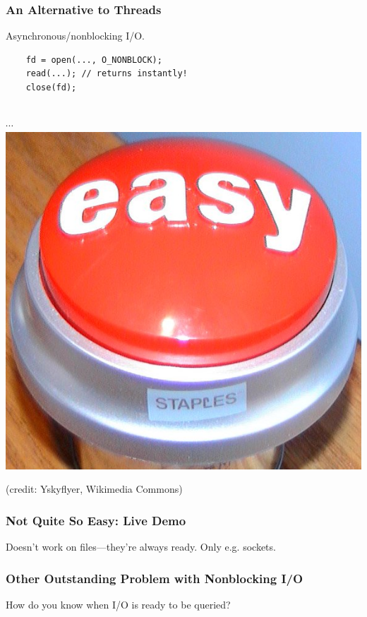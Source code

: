 \documentclass[aspectratio=43]{beamer}
\newenvironment{changemargin}[1]{%
  \begin{list}{}{%
    \setlength{\topsep}{0pt}%
    \setlength{\leftmargin}{#1}%
    \setlength{\rightmargin}{1em}
    \setlength{\listparindent}{\parindent}%
    \setlength{\itemindent}{\parindent}%
    \setlength{\parsep}{\parskip}%
  }%
  \item[]}{\end{list}}
\begin{document}
\begin{frame}[fragile]
  \frametitle{An Alternative to Threads}
  \begin{changemargin}{2em}
    Asynchronous/nonblocking I/O.\\[2em]

\begin{changemargin}{3em}
\begin{minipage}{.6\textwidth}
\begin{lstlisting}
    fd = open(..., O_NONBLOCK);
    read(...); // returns instantly!
    close(fd);
  \end{lstlisting}
\end{minipage}
\end{changemargin}

\begin{center}
~\\[1em]
$\cdots$\\[2em]

\includegraphics[width=.25\textwidth]{L06/Easy_button.JPG}
\end{center}
\hfill {\scriptsize (credit: Yskyflyer, Wikimedia Commons)}

  \end{changemargin}
\end{frame}

\begin{frame}
  \frametitle{Not Quite So Easy: Live Demo}
  \begin{changemargin}{2em}
    Doesn't work on files---they're always ready. Only e.g. sockets.
  \end{changemargin}
\end{frame}

\begin{frame}
  \frametitle{Other Outstanding Problem with Nonblocking I/O}
  \begin{changemargin}{2em}
    How do you know when I/O is ready to be queried?

  \end{changemargin}
\end{frame}
\end{document}
